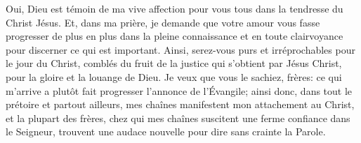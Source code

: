 Oui, Dieu est témoin de ma vive affection pour vous tous
	dans la tendresse du Christ Jésus.
Et, dans ma prière, je demande que votre amour vous fasse progresser de plus en plus
	dans la pleine connaissance et en toute clairvoyance
		pour discerner ce qui est important.
Ainsi, serez-vous purs et irréprochables pour le jour du Christ,
	comblés du fruit de la justice qui s’obtient par Jésus Christ,
	pour la gloire et la louange de Dieu.
Je veux que vous le sachiez, frères:
	ce qui m’arrive a plutôt fait progresser l’annonce de l’Évangile;
	ainsi donc, dans tout le prétoire et partout ailleurs,
	mes chaînes manifestent mon attachement au Christ,
	et la plupart des frères,
	chez qui mes chaînes suscitent une ferme confiance dans le Seigneur,
	trouvent une audace nouvelle pour dire sans crainte la Parole.
